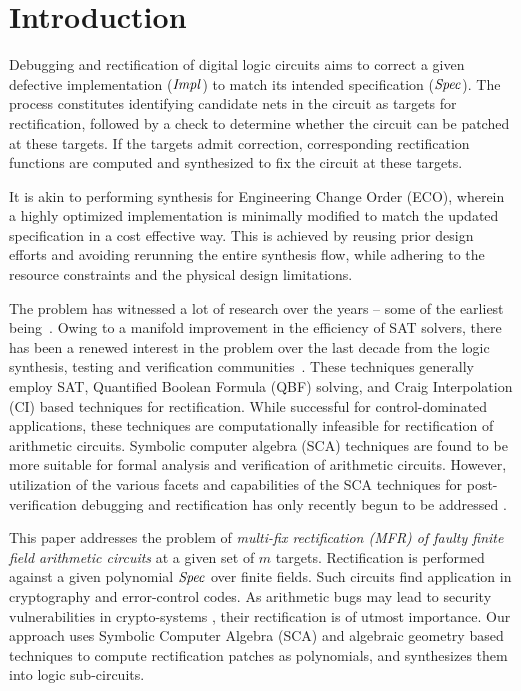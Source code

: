 \section{Introduction}
Debugging and rectification of digital logic circuits aims to correct
a given defective implementation (${\it Impl}$) to match its intended
specification (${\it Spec}$). The process constitutes identifying
candidate nets in the circuit as targets for rectification, followed by  
a check to determine whether the circuit can be patched at these
targets. If the targets admit correction, corresponding rectification
functions are computed and synthesized to fix the circuit at these targets.
{\red  
It is akin to performing synthesis for Engineering Change Order 
(ECO), wherein a highly optimized implementation is minimally modified to match the 
updated specification in a cost effective way. This is achieved by reusing prior design 
efforts and avoiding rerunning the entire synthesis flow, while adhering to the resource 
constraints and the physical design limitations.

The problem has witnessed a lot of research over the years -- 
some of the earliest being~\cite{Sadowska:DAC95,scholl:1,andreas:2005}.
Owing to a manifold improvement in the efficiency of SAT solvers,
there has been a renewed interest in the problem over the last decade from 
the logic synthesis, testing and verification communities~\cite{
MF_Huang:DATE12,scholl:2,SS_Fujita:ISQED17,SS_Alan:DAC18}.
These techniques generally employ SAT, Quantified Boolean Formula (QBF) solving,
and Craig Interpolation (CI) based techniques for rectification. While
successful for control-dominated applications, these techniques are
computationally infeasible for rectification of arithmetic circuits.
Symbolic computer algebra (SCA) techniques are found to be more
suitable for formal analysis and verification of arithmetic circuits.
However, utilization of the various facets and capabilities of the SCA
techniques for post-verification debugging and rectification has only
recently begun to be addressed
\cite{farimah:2017:1,MF_Rolf:ISVLSI18,Utkarsh:VLSI18,
Vkrao:FMCAD18,Vkrao:ISQED21,Vkrao:GLSVLSI21}. }

This paper addresses the problem of {\it multi-fix rectification (MFR)
  of faulty finite field arithmetic circuits} at a given set of $m$
targets. Rectification is performed against a 
given polynomial ${\it Spec}$ over finite
fields. Such circuits find application in cryptography and error-control codes. 
{\red As arithmetic bugs may lead to security
vulnerabilities in crypto-systems \cite{crypto:bug_attacks}, their
rectification is of utmost importance. 
Our approach uses Symbolic Computer Algebra (SCA) and
algebraic geometry based techniques to compute rectification patches
as polynomials, and synthesizes them into logic sub-circuits.}


